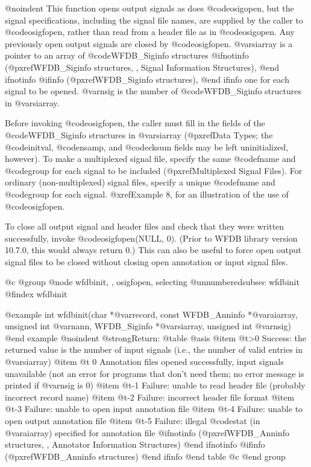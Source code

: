 {{{{{{{{@noindent
This function opens output signals as does @code{osigopen}, but the
signal specifications, including the signal file names, are supplied by
the caller to @code{osigfopen}, rather than read from a header
file as in @code{osigopen}.  Any previously open output signals are
closed by @code{osigfopen}.  @var{siarray} is a pointer to an array of
@code{WFDB_Siginfo} structures
@ifnotinfo
(@pxref{WFDB_Siginfo structures, , Signal Information Structures}),
@end ifnotinfo
@ifinfo
(@pxref{WFDB_Siginfo structures}),
@end ifinfo
one for each signal to be opened.  @var{nsig} is the number of
@code{WFDB_Siginfo} structures in @var{siarray}.

Before invoking @code{osigfopen}, the caller must fill in the fields of
the @code{WFDB_Siginfo} structures in @var{siarray} (@pxref{Data Types};
the @code{initval}, @code{nsamp}, and @code{cksum} fields may be left
uninitialized, however).  To make a multiplexed signal file, specify the
same @code{fname} and @code{group} for each signal to be included
(@pxref{Multiplexed Signal Files}).  For ordinary (non-multiplexed)
signal files, specify a unique @code{fname} and @code{group} for each
signal.  @xref{Example 8}, for an illustration of the use of
@code{osigfopen}.

To close all output signal and header files and check that they were written
successfully, invoke @code{osigfopen(NULL, 0)}.  (Prior to WFDB library version
10.7.0, this would always return 0.)  This can also be useful to force open
output signal files to be closed without closing open annotation or input
signal files.

@c @group
@node     wfdbinit, , osigfopen, selecting    
@unnumberedsubsec wfdbinit
@findex wfdbinit

@example
int wfdbinit(char *@var{record},
             const WFDB_Anninfo *@var{aiarray}, unsigned int @var{nann},
             WFDB_Siginfo *@var{siarray}, unsigned int @var{nsig})
@end example
@noindent
@strong{Return:}
@table @asis
@item @t{>0}
Success: the returned value is the number of input signals (i.e., the
number of valid entries in @var{siarray})
@item @t{ 0}
Annotation files opened successfully, input signals unavailable
(not an error for programs that don't need them; no error
message is printed if @var{nsig} is 0)
@item @t{-1}
Failure: unable to read header file (probably incorrect record
name)
@item @t{-2}
Failure: incorrect header file format
@item @t{-3}
Failure: unable to open input annotation file
@item @t{-4}
Failure: unable to open output annotation file
@item @t{-5}
Failure: illegal @code{stat} (in @var{aiarray}) specified for annotation file
@ifnotinfo
(@pxref{WFDB_Anninfo structures, , Annotator Information Structures})
@end ifnotinfo
@ifinfo
(@pxref{WFDB_Anninfo structures})
@end ifinfo
@end table
@c @end group

}}}}}}}}
